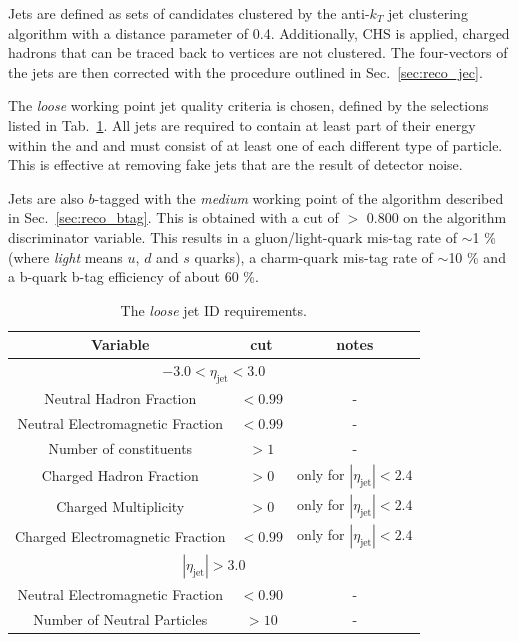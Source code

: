 Jets are defined as sets of \PF candidates clustered by
the anti-$k_{T}$ jet clustering algorithm with
a distance parameter of 0.4. Additionally, \ac{CHS} is applied, charged
hadrons that can be traced back to \PU vertices are not clustered. The
four-vectors of the jets are then corrected with the procedure
outlined in Sec.~\ref{sec:reco_jec}.

The \emph{loose} working point jet quality criteria is chosen, defined
by the selections listed in Tab.~\ref{tab:loose-jet-id}. All jets are
required to contain at least part of their energy within the \ECAL and
\HCAL and must consist of at least one of each different type of
particle. This is effective at removing fake jets that are the result
of detector noise.  

Jets are also $b$-tagged with the \emph{medium} working point of the
algorithm described in Sec.~\ref{sec:reco_btag}. This is obtained with
a cut of $>$ 0.800 on the algorithm discriminator variable. This
results in a gluon/light-quark mis-tag rate of $\sim$1 \% (where
\emph{light} means $u$, $d$ and $s$ quarks), a charm-quark mis-tag
rate of $\sim$10 \% and a b-quark b-tag efficiency of about 60 \%. 

\begin{table}[ht!]
  \caption{The \emph{loose} jet ID requirements. \label{tab:loose-jet-id}}
  \centering
  \begin{tabular}{ ccc }
    Variable & cut & notes \\ \hline
    \multicolumn{3}{c}{$-3.0 < \eta_{\mathrm{jet}} < 3.0$} \\ \hline    
    Neutral Hadron Fraction & $<0.99$ & - \\
    Neutral Electromagnetic Fraction & $<0.99$ & - \\
    Number of constituents & $>1$ & - \\
    Charged Hadron Fraction & $>0$ & only for $|\eta_{\mathrm{jet}}| < 2.4$ \\
    Charged Multiplicity & $>0$ & only for $|\eta_{\mathrm{jet}}| < 2.4$ \\
    Charged Electromagnetic Fraction & $<0.99$ & only for $|\eta_{\mathrm{jet}}| < 2.4$ \\ \hline
    \multicolumn{3}{c}{$|\eta_{\mathrm{jet}}| > 3.0$} \\ \hline        
    Neutral Electromagnetic Fraction & $<0.90$ & - \\
    Number of Neutral Particles & $>10$ & - \\
  \end{tabular}
\end{table}

